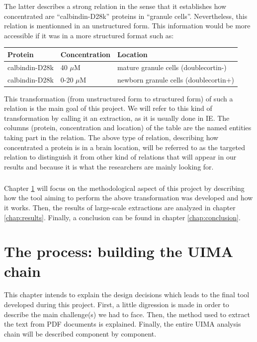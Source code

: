 \documentclass{report}
\begin{document}
		The latter describes a strong relation in the sense that it establishes 
		how concentrated are ``calbindin-D28k'' proteins in ``granule cells''.
		Nevertheless, this relation is mentionned in an unstructured form. This
		information would be more accessible if it was in a more structured 	
		format such as:
		\begin{center}
			\begin{tabular}{|l|l|l|}
				\hline
				\textbf{Protein} & \textbf{Concentration} & \textbf{Location}\\
				\hline
				calbindin-D28k & 40 $\mu$M & mature granule cells (doublecortin-)\\
				\hline
				calbindin-D28k & 0-20 $\mu$M & newborn granule cells (doublecortin+)\\
				\hline
			\end{tabular} 
		\end{center}
		This transformation (from unstructured form to structured form) of such 
		a relation is the main goal of this project. We will refer to this kind
		of transformation by calling it an extraction, as it is usually done in 
		IE. The columns (protein, concentration and location) of the table are 
		the named entities taking part in the
		relation. The above type of relation, 
		describing how concentrated a protein is in a brain location, will be
		referred to as the targeted relation to distinguish it from
		other kind of relations that will appear in our 
		results and because it is what the researchers are mainly looking for.  
		
		\paragraph{}Chapter \ref{chap:overall_model} will focus on the methodological aspect
		of this project by describing how the tool aiming to perform the above 
		transformation was developed and how it works. Then, the results of
		large-scale extractions are analyzed in chapter \ref{chap:results}.
		Finally, a conclusion can be found in chapter \ref{chap:conclusion}.
	            
                \chapter{The process: building the UIMA chain}
                \label{chap:overall_model}
                
                This chapter intends to explain the design decisions which leads to the final
				tool developed during this project. First, a little digression
				is made in order to describe the main challenge(s) we had to face.
				Then, the method used to extract the text from PDF documents is
				explained. Finally, the entire UIMA analysis chain will be 
				described component by component. 
				
\end{document}
